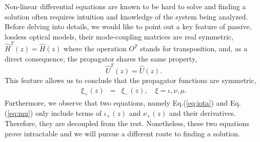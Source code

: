 \documentclass[9pt,twocolumn,twoside]{osajnl}
\begin{document}
Non-linear differential equations are known to be hard to solve and finding a solution 
often requires intuition and knowledge of the system being analyzed. 
Before delving into details, we would like to point out a key feature of passive, lossless optical models, their mode-coupling matrices are real symmetric, $\hat{H}^{T}(z) = \hat{H}(z)$ where the operation $O^{T}$ stands for transposition,  and, as a direct consequence, the propagator shares the same property,
\begin{equation}  
	\hat{U}^{T}(z)=\hat{U}(z).
\end{equation} 
This feature allows us to conclude that the propagator functions are symmetric,
\begin{eqnarray}
	\xi_{+}(z)&=&\xi_{-}(z), \quad \xi = \iota, \nu, \mu.
\end{eqnarray}
Furthermore, we observe that two equations, namely Eq.(\ref{eq:iota}) and Eq.(\ref{eq:mu}) only include terms of $\iota_{+}(z)$ and $\nu_{+}(z)$ and their derivatives. 
Therefore, they are decoupled from the rest. 
Nonetheless, these two equations prove intractable and we will pursue a different route to finding a solution.
\end{document}
